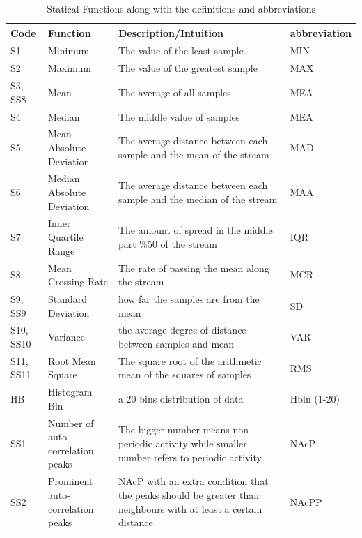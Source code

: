 \documentclass[journal,article,submit,moreauthors,pdftex]{Definitions/mdpi}
\begin{document}
\begin{table}[H]
	\caption{Statical Functions along with the definitions and abbreviations }
	\centering
	\begin{tabular}{p{0.9cm}p{5cm}p{7cm}p{1.3cm}}
		\toprule
		\textbf{Code} & \textbf{Function} & \textbf{Description/Intuition} & \textbf{{\scriptsize abbreviation}} \\
		\midrule
		{\footnotesize S1}&Minimum & {\scriptsize The value of the least sample}& MIN\\
		S2&Maximum & {\scriptsize The value of the greatest sample}& MAX\\
		{\footnotesize S3, SS8}&Mean&  {\scriptsize The average of all samples}& MEA\\
		{\footnotesize S4}&Median&  {\scriptsize The middle value of samples}& MEA\\
		{\footnotesize S5}&{\footnotesize Mean Absolute Deviation}& {\scriptsize The average distance between each sample and the mean of the stream}& MAD\\
		{\footnotesize S6}&{\footnotesize Median Absolute Deviation}& {\scriptsize The average distance between each sample and the median of the stream}& MAA\\
		{\footnotesize S7}&Inner Quartile Range  & {\scriptsize The amount of spread in the middle part \%50 of the stream}& IQR\\
		{\footnotesize S8}&Mean Crossing Rate& {\scriptsize The rate of passing the mean along the stream}& MCR\\
		{\footnotesize S9, SS9}&Standard Deviation& {\scriptsize how far the samples are from the mean}& SD\\
		{\footnotesize S10, SS10}&Variance& {\scriptsize the average degree of distance between samples and mean}& VAR\\
		{\footnotesize S11, SS11}&Root Mean Square& {\scriptsize The square root of the arithmetic mean of the squares of samples}& RMS\\
		{\footnotesize HB}& Histogram Bin&{\scriptsize a 20 bins distribution of data } & Hbin (1-20) \\
		{\footnotesize SS1}&Number of auto-correlation peaks& {\scriptsize The bigger number means non-periodic activity while smaller number refers to periodic activity }& NAcP\\
		{\footnotesize SS2}&Prominent auto-correlation peaks&{\scriptsize NAcP with an extra condition that the peaks should be greater than neighbours with at least a certain distance} & NAcPP \\

\end{tabular}
\end{table}
\end{document}
